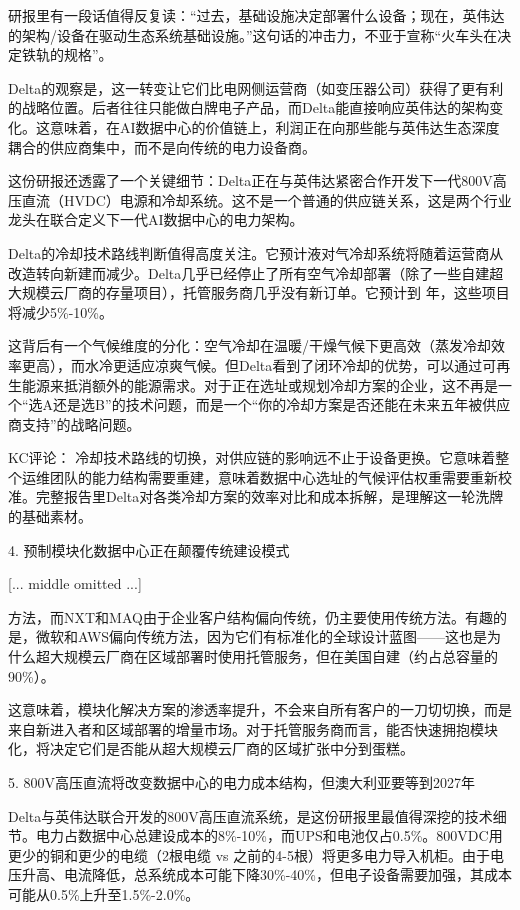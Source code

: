 \documentclass[11pt]{ctexart}
\begin{document}
研报里有一段话值得反复读：“过去，基础设施决定部署什么设备；现在，英伟达的架构/设备在驱动生态系统基础设施。”这句话的冲击力，不亚于宣称“火车头在决定铁轨的规格”。

Delta的观察是，这一转变让它们比电网侧运营商（如变压器公司）获得了更有利的战略位置。后者往往只能做白牌电子产品，而Delta能直接响应英伟达的架构变化。这意味着，在AI数据中心的价值链上，利润正在向那些能与英伟达生态深度耦合的供应商集中，而不是向传统的电力设备商。

这份研报还透露了一个关键细节：Delta正在与英伟达紧密合作开发下一代800V高压直流（HVDC）电源和冷却系统。这不是一个普通的供应链关系，这是两个行业龙头在联合定义下一代AI数据中心的电力架构。

Delta的冷却技术路线判断值得高度关注。它预计液对气冷却系统将随着运营商从改造转向新建而减少。Delta几乎已经停止了所有空气冷却部署（除了一些自建超大规模云厂商的存量项目），托管服务商几乎没有新订单。它预计到 年，这些项目将减少5\%-10\%。

这背后有一个气候维度的分化：空气冷却在温暖/干燥气候下更高效（蒸发冷却效率更高），而水冷更适应凉爽气候。但Delta看到了闭环冷却的优势，可以通过可再生能源来抵消额外的能源需求。对于正在选址或规划冷却方案的企业，这不再是一个“选A还是选B”的技术问题，而是一个“你的冷却方案是否还能在未来五年被供应商支持”的战略问题。

KC评论： 冷却技术路线的切换，对供应链的影响远不止于设备更换。它意味着整个运维团队的能力结构需要重建，意味着数据中心选址的气候评估权重需要重新校准。完整报告里Delta对各类冷却方案的效率对比和成本拆解，是理解这一轮洗牌的基础素材。

4. 预制模块化数据中心正在颠覆传统建设模式

[... middle omitted ...]

方法，而NXT和MAQ由于企业客户结构偏向传统，仍主要使用传统方法。有趣的是，微软和AWS偏向传统方法，因为它们有标准化的全球设计蓝图——这也是为什么超大规模云厂商在区域部署时使用托管服务，但在美国自建（约占总容量的90\%）。

这意味着，模块化解决方案的渗透率提升，不会来自所有客户的一刀切切换，而是来自新进入者和区域部署的增量市场。对于托管服务商而言，能否快速拥抱模块化，将决定它们是否能从超大规模云厂商的区域扩张中分到蛋糕。

5. 800V高压直流将改变数据中心的电力成本结构，但澳大利亚要等到2027年

Delta与英伟达联合开发的800V高压直流系统，是这份研报里最值得深挖的技术细节。电力占数据中心总建设成本的8\%-10\%，而UPS和电池仅占0.5\%。800VDC用更少的铜和更少的电缆（2根电缆 vs 之前的4-5根）将更多电力导入机柜。由于电压升高、电流降低，总系统成本可能下降30\%-40\%，但电子设备需要加强，其成本可能从0.5\%上升至1.5\%-2.0\%。
\end{document}
